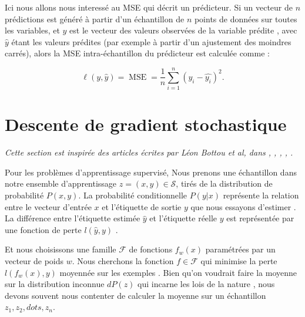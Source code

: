 		 Ici nous allons nous interessé au MSE qui décrit un prédicteur. Si un vecteur de ${\displaystyle n}$ prédictions est généré à partir d'un échantillon de ${\displaystyle n}$ points de données sur toutes les variables, et ${\displaystyle y}$ est le vecteur des valeurs observées de la variable prédite , avec ${\displaystyle {\hat {y}}}$ étant les valeurs prédites (par exemple à partir d'un ajustement des moindres carrés), alors la MSE intra-échantillon du prédicteur est calculée comme :
		 
	
		 \begin{equation}
		 	{\displaystyle \ell(y,\hat{y}) = \operatorname {MSE} ={\frac {1}{n}}\sum_{i=1}^{n}(y_{i}-{\hat {y_{i}}})^{2}.}
		 \end{equation}
		 
	
	
	
	

	
	\section{Descente de gradient stochastique} \label{sec:sgd}
	\textit{Cette section est inspirée des articles écrites par Léon Bottou et al, dans \cite{bottou2012stochastic, bottou2010large},
	\cite{framling2004scaled},
	\cite{bottou2018optimization},
	\cite{netrapalli2019stochastic},
	\cite{wijnhoven2010fast}.}
	
	Pour les problèmes d'apprentissage supervisé, Nous prenons une échantillon  dans notre ensemble  d'apprentissage $z = (x, y) \in \mathcal{S}$, tirés de la distribution de probabilité $P(x, y)$. La probabilité conditionnelle $P(y|x)$ représente la relation entre le vecteur d'entrée $x$ et l'étiquette de sortie $y$ que nous essayons d'estimer \cite{wijnhoven2010fast}. La différence entre l'étiquette estimée $\hat{y}$ et l'étiquette réelle $y$ est représentée par une fonction de perte $l(\hat{y}, y)$ \cite{bottou2012stochastic}.
	
	Et nous choisissons une famille $\mathcal{F}$ de fonctions $f_w(x)$ paramétrées par un vecteur de poids $w$. Nous cherchons la fonction $ f \in \mathcal{F}$ qui minimise la perte $l(f_w(x), y)$ moyennée sur les exemples  \cite{wijnhoven2010fast}. Bien qu’on voudrait faire la moyenne  sur la distribution inconnue $dP(z)$ qui incarne les lois de la nature \cite{bottou2012stochastic}, nous devons souvent nous contenter de calculer la moyenne sur un échantillon $z_1,z_2,dots,z_n$.
	
